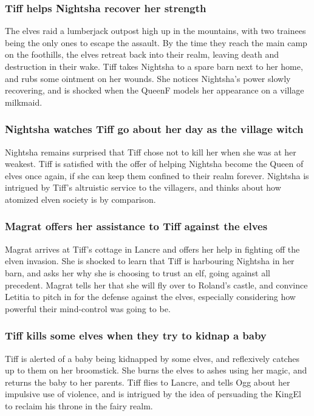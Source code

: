 \subsubsection{\Gls{Tiff} helps \Gls{Nightsha} recover her strength}
The elves raid a lumberjack outpost high up in the mountains, with two trainees being the only
ones to escape the assault. By the time they reach the main camp on the foothills, the elves retreat
back into their realm, leaving death and destruction in their wake. \Gls{Tiff} takes \Gls{Nightsha}
to a spare barn next to her home, and rubs some ointment on her wounds. She notices \Gls{Nightsha}'s
power slowly recovering, and is shocked when the \Gls{QueenF} models her appearance on a village
milkmaid.

\subsubsection{\Gls{Nightsha} watches \Gls{Tiff} go about her day as the village witch}
\Gls{Nightsha} remains surprised that \Gls{Tiff} chose not to kill her when she was at her weakest.
\Gls{Tiff} is satisfied with the offer of helping \Gls{Nightsha} become the Queen of elves once
again, if she can keep them confined to their realm forever. \Gls{Nightsha} is intrigued by
\Gls{Tiff}'s altruistic service to the villagers, and thinks about how atomized elven society is
by comparison.

\subsubsection{\Gls{Magrat} offers her assistance to \Gls{Tiff} against the elves}
\Gls{Magrat} arrives at \Gls{Tiff}'s cottage in Lancre and offers her help in fighting off the
elven invasion. She is shocked to learn that \Gls{Tiff} is harbouring \Gls{Nightsha} in her barn,
and asks her why she is choosing to trust an elf, going against all precedent. \Gls{Magrat} tells
her that she will fly over to \Gls{Roland}'s castle, and convince \Gls{Letitia} to pitch in for the
defense against the elves, especially considering how powerful their mind-control was going to be.

\subsubsection{\Gls{Tiff} kills some elves when they try to kidnap a baby}
\Gls{Tiff} is alerted of a baby being kidnapped by some elves, and reflexively catches up to them
on her broomstick. She burns the elves to ashes using her magic, and returns the baby to her
parents. \Gls{Tiff} flies to Lancre, and tells \Gls{Ogg} about her impulsive use of violence, and
is intrigued by the idea of persuading the \Gls{KingEl} to reclaim his throne in the fairy realm.

